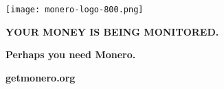 \documentclass[10pt, oneside, final]{article}
\begin{document}
		\thispagestyle{empty}

		\begin{center}
				\texttt{[image: monero-logo-800.png]}
		\end{center}

		\centerline{\large\textsf{\textbf{YOUR MONEY IS BEING MONITORED.}}}
		\centerline{\large\textsf{\textbf{Perhaps you need Monero.}}}

		\centerline{\textsf{\textbf{getmonero.org}}}
\end{document}
